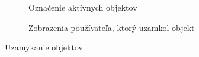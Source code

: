 \begin{figure}
	\centering
	\begin{subfigure}[t]{0.48\linewidth}	
		\caption{Označenie aktívnych objektov}
	\end{subfigure}
	\quad
	\begin{subfigure}[t]{0.48\linewidth}	
		\caption{Zobrazenia používateľa, ktorý uzamkol objekt}
	\end{subfigure}
	
	\caption{Uzamykanie objektov}
\end{figure}


